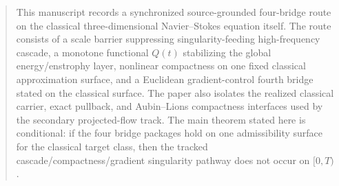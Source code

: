 \begin{abstract}
This manuscript records a synchronized source-grounded four-bridge route on the classical three-dimensional Navier--Stokes equation itself. The route consists of a scale barrier suppressing singularity-feeding high-frequency cascade, a monotone functional \(Q(t)\) stabilizing the global energy/enstrophy layer, nonlinear compactness on one fixed classical approximation surface, and a Euclidean gradient-control fourth bridge stated on the classical surface. The paper also isolates the realized classical carrier, exact pullback, and Aubin--Lions compactness interfaces used by the secondary projected-flow track. The main theorem stated here is conditional: if the four bridge packages hold on one admissibility surface for the classical target class, then the tracked cascade/compactness/gradient singularity pathway does not occur on \([0,T)\).
\end{abstract}
